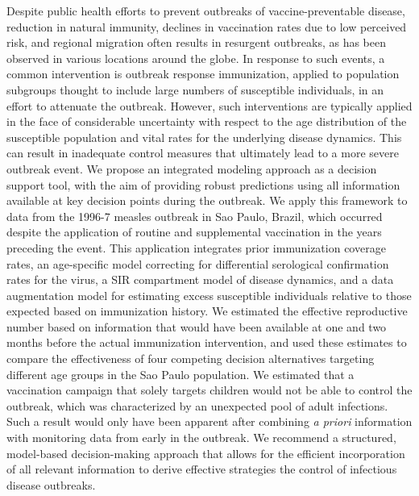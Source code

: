 Despite public health efforts to prevent outbreaks of vaccine-preventable disease, reduction in natural immunity, declines in vaccination rates due to low perceived risk, and regional migration  often results in resurgent outbreaks, as has been observed in various locations around the globe. In response to such events, a common intervention is outbreak response immunization, applied to population subgroups thought to include large numbers of susceptible individuals, in an effort to attenuate the outbreak. However, such interventions are typically applied in the face of considerable uncertainty with respect to the age distribution of the susceptible population and vital rates for the underlying disease dynamics. This can result in inadequate control measures that ultimately lead to a more severe outbreak event. We propose an integrated modeling approach as a decision support tool, with the aim of providing robust predictions using all information available at key decision points during the outbreak. We apply this framework to data from the 1996-7 measles outbreak in Sao Paulo, Brazil, which occurred despite the application of routine and supplemental vaccination in the years preceding the event. This application integrates prior immunization coverage rates, an age-specific model correcting for differential serological confirmation rates for the virus, a SIR compartment model of disease dynamics, and a data augmentation model for estimating excess susceptible individuals relative to those expected based on immunization history. We estimated the effective reproductive number based on information that would have been available at one and two months before the actual immunization intervention, and used these estimates to compare the effectiveness of four competing decision alternatives targeting different age groups in the Sao Paulo population. We estimated that a vaccination campaign that solely targets children would not be able to control the outbreak, which was characterized by an unexpected pool of adult infections. Such a result would only have been apparent after combining \textit{a priori} information with monitoring data from early in the outbreak. We recommend a structured, model-based decision-making approach that allows for the efficient incorporation of all relevant information to derive effective strategies the control of infectious disease outbreaks.
